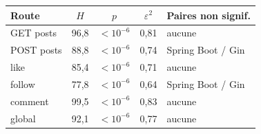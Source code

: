 \begin{tabular}{@{}lcccp{2.9cm}@{}}
\toprule
\textbf{Route} & \textbf{$H$} & \textbf{$p$} & \textbf{$\varepsilon^2$} & \textbf{Paires non signif.} \\
\midrule
GET posts & 96,8 & $<10^{-6}$ & 0,81 & aucune \\
POST posts & 88,8 & $<10^{-6}$ & 0,74 & Spring Boot / Gin \\
like & 85,4 & $<10^{-6}$ & 0,71 & aucune \\
follow & 77,8 & $<10^{-6}$ & 0,64 & Spring Boot / Gin \\
comment & 99,5 & $<10^{-6}$ & 0,83 & aucune \\
global & 92,1 & $<10^{-6}$ & 0,77 & aucune \\
\bottomrule
\end{tabular}
